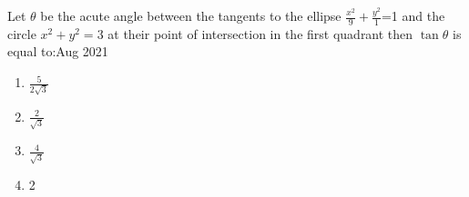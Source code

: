 \bigskip
\item Let $\theta$ be the acute angle between the tangents to the ellipse $\frac{x^2}{9}+\frac{y^2}{1}$=1 and the circle $x^2+y^2=3$ at their point of intersection in the first quadrant then $\tan{\theta}$ is equal to:\hfill{Aug 2021}
\begin{enumerate}
    \item $\frac{5}{2\sqrt{3}}$
    \item $\frac{2}{\sqrt{3}}$
    \item $\frac{4}{\sqrt{3}}$
    \item 2
\end{enumerate}


